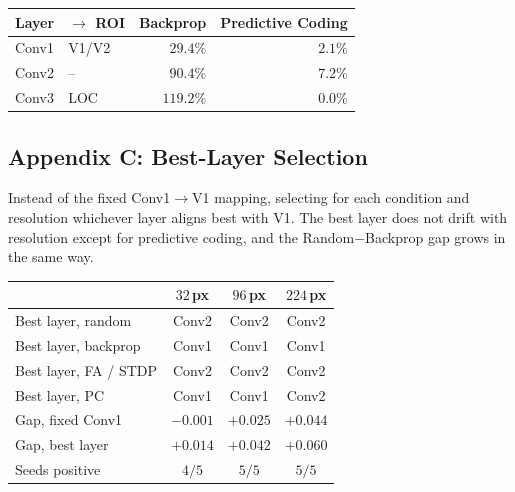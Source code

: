 \documentclass[10pt,twocolumn]{article}
\begin{document}
\begingroup
\footnotesize
\begin{tabular}{@{}llrr@{}}
\toprule
Layer & $\to$ ROI & Backprop & Predictive Coding \\
\midrule
Conv1 & V1/V2 & $29.4\%$ & $2.1\%$ \\
Conv2 & --    & $90.4\%$ & $7.2\%$ \\
Conv3 & LOC   & $119.2\%$ & $0.0\%$ \\
\bottomrule
\end{tabular}
\endgroup

\subsection*{Appendix C: Best-Layer Selection}

\noindent Instead of the fixed Conv1$\to$V1 mapping, selecting for each condition and resolution whichever layer aligns best with V1. The best layer does not drift with resolution except for predictive coding, and the Random$-$Backprop gap grows in the same way.

\begingroup
\footnotesize
\begin{tabular}{@{}lccc@{}}
\toprule
 & $32$\,px & $96$\,px & $224$\,px \\
\midrule
Best layer, random & Conv2 & Conv2 & Conv2 \\
Best layer, backprop & Conv1 & Conv1 & Conv1 \\
Best layer, FA / STDP & Conv2 & Conv2 & Conv2 \\
Best layer, PC & Conv1 & Conv1 & Conv2 \\
\midrule
Gap, fixed Conv1 & $-0.001$ & $+0.025$ & $+0.044$ \\
Gap, best layer & $+0.014$ & $+0.042$ & $+0.060$ \\
Seeds positive & $4/5$ & $5/5$ & $5/5$ \\
\bottomrule
\end{tabular}
\endgroup
\end{document}
